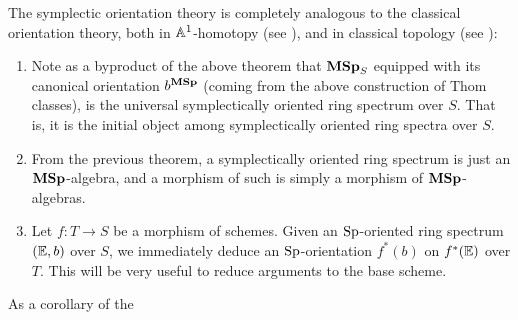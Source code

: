\begin{rem} The symplectic orientation theory is completely analogous to
 the classical orientation theory, both in $\AA^1$-homotopy (see \cite[Section 2.1]{Deg12}), 
 and in classical topology (see \cite[Definition 4.1.1]{Ra03}):
\begin{enumerate}
\item Note as a byproduct of the above theorem that $\MSp_S$ equipped with its canonical
 orientation $b^\MSp$ (coming from the above construction of Thom classes),
 is the universal symplectically oriented ring spectrum over $S$.
 That is, it is the initial object among symplectically oriented ring spectra over $S$.
\item From the previous theorem, a symplectically oriented ring spectrum is just
 an $\MSp$-algebra, and a morphism of such is simply a morphism of $\MSp$-algebras.
\item Let $f:T \rightarrow S$ be a morphism of schemes.
 Given an $\Sp$-oriented ring spectrum $(\E,b)$ over $S$,
 we immediately deduce an $\Sp$-orientation $f^*(b)$ on $f^*(\E)$ over $T$.
 This will be very useful to reduce arguments to the base scheme.
\end{enumerate}
\end{rem}

As a corollary of the 

